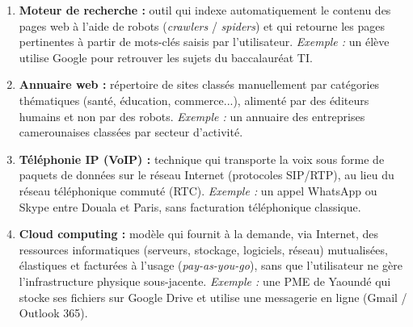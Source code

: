 \documentclass[11pt]{article}
\begin{document}
\begin{corrige}
\begin{enumerate}
    \item \textbf{Moteur de recherche :} outil qui indexe automatiquement le contenu des pages web à l'aide de robots (\emph{crawlers} / \emph{spiders}) et qui retourne les pages pertinentes à partir de mots-clés saisis par l'utilisateur. \emph{Exemple :} un élève utilise Google pour retrouver les sujets du baccalauréat TI.
    \item \textbf{Annuaire web :} répertoire de sites classés manuellement par catégories thématiques (santé, éducation, commerce...), alimenté par des éditeurs humains et non par des robots. \emph{Exemple :} un annuaire des entreprises camerounaises classées par secteur d'activité.
    \item \textbf{Téléphonie IP (VoIP) :} technique qui transporte la voix sous forme de paquets de données sur le réseau Internet (protocoles SIP/RTP), au lieu du réseau téléphonique commuté (RTC). \emph{Exemple :} un appel WhatsApp ou Skype entre Douala et Paris, sans facturation téléphonique classique.
    \item \textbf{Cloud computing :} modèle qui fournit à la demande, via Internet, des ressources informatiques (serveurs, stockage, logiciels, réseau) mutualisées, élastiques et facturées à l'usage (\emph{pay-as-you-go}), sans que l'utilisateur ne gère l'infrastructure physique sous-jacente. \emph{Exemple :} une PME de Yaoundé qui stocke ses fichiers sur Google Drive et utilise une messagerie en ligne (Gmail / Outlook 365).
\end{enumerate}
\end{corrige}
\end{document}

